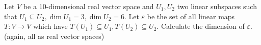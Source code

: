 Let \(V\) be a 10-dimensional real vector space and \(U_1,U_2\) two linear subspaces such that \(U_1 \subseteq U_2, \dim U_1 =3, \dim U_2=6\). Let \(\varepsilon\) be the set of all linear maps \(T\colon  V\to V\) which have \(T(U_1)\subseteq U_1, T(U_2)\subseteq U_2\). Calculate the dimension of \(\varepsilon\). (again, all as real vector spaces)